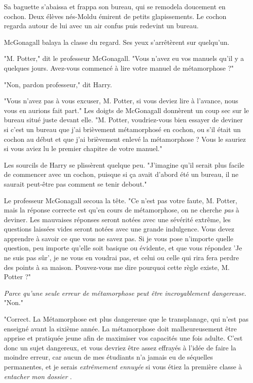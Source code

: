 Sa baguette s'abaissa et frappa son bureau, qui se remodela doucement en cochon. Deux élèves nés-Moldu émirent de petits glapissements. Le cochon regarda autour de lui avec un air confus puis redevint un bureau.

McGonagall balaya la classe du regard. Ses yeux s'arrêtèrent sur quelqu'un.

"M. Potter," dit le professeur McGonagall. "Vous n'avez eu vos manuels qu'il y a quelques jours. Avez-vous commencé à lire votre manuel de métamorphose ?"

"Non, pardon professeur," dit Harry.

"Vous n'avez pas à vous excuser, M. Potter, si vous deviez lire à l'avance, nous vous en aurions fait part." Les doigts de McGonagall donnèrent un coup sec sur le bureau situé juste devant elle. "M. Potter, voudriez-vous bien essayer de deviner si c'est un bureau que j'ai brièvement métamorphosé en cochon, ou s'il était un cochon au début et que j'ai brièvement enlevé la métamorphose ? Vous le sauriez si vous aviez lu le premier chapitre de votre manuel."

Les sourcils de Harry se plissèrent quelque peu. "J'imagine qu'il serait plus facile de commencer avec un cochon, puisque si ça avait d'abord été un bureau, il ne saurait peut-être pas comment se tenir debout."

Le professeur McGonagall secoua la tête. "Ce n'est pas votre faute, M. Potter, mais la réponse correcte est qu'en cours de métamorphose, on ne cherche \emph{pas}  à deviner. Les mauvaises réponses seront notées avec une sévérité extrême, les questions laissées vides seront notées avec une grande indulgence. Vous devez apprendre à savoir ce que vous ne savez pas. Si je vous pose n'importe quelle question, peu importe qu'elle soit basique ou évidente, et que vous répondez 'Je ne suis pas sûr', je ne vous en voudrai pas, et celui ou celle qui rira fera perdre des points à sa maison. Pouvez-vous me dire pourquoi cette règle existe, M. Potter ?"

\emph{Parce qu'une seule erreur de métamorphose peut être incroyablement dangereuse.}  "Non."

"Correct. La Métamorphose est plus dangereuse que le transplanage, qui n'est pas enseigné avant la sixième année. La métamorphose doit malheureusement être apprise et pratiquée jeune afin de maximiser vos capacités une fois adulte. C'est donc un sujet dangereux, et vous devriez être assez effrayés à l'idée de faire la moindre erreur, car aucun de mes étudiants n'a jamais eu de séquelles permanentes, et je serais \emph{extrêmement ennuyée}  si vous étiez la première classe à \emph{entacher mon dossier} .

